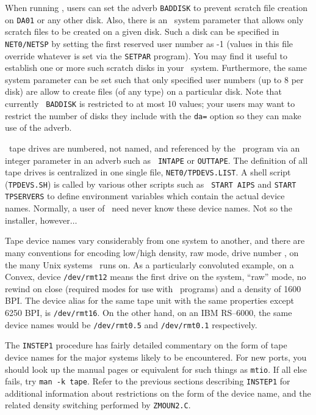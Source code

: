 When running \AIPS, users can set the adverb {\tt BADDISK} to prevent
scratch file creation on {\tt\dol DA01} or any other disk.  Also, there is
an \AIPS\ system parameter that allows only scratch files to be created
on a given disk.  Such a disk can be specified in {\tt \dol NET0/NETSP} by
setting the first reserved user number as -1 (values in this file
override whatever is set via the {\tt SETPAR} program).  You may find it
useful to establish one or more such scratch disks in your
\AIPS\ system.  Furthermore, the same system parameter can be set such
that only specified user numbers (up to 8 per disk) are allow to create
files (of any type) on a particular disk.  Note that currently {\tt
BADDISK} is restricted to at most 10 values; your users may want to
restrict the number of disks they include with the {\tt da=} option so
they can make use of the adverb.
\medskip


\AIPS\ tape drives are numbered, not named, and referenced by the
\ttaips\ program via an integer parameter in an adverb such as {\tt
INTAPE} or {\tt OUTTAPE}.  The definition of all tape drives is
centralized in one single file, {\tt\dol NET0/TPDEVS.LIST}.  A shell
script ({\tt TPDEVS.SH}) is called by various other scripts such as {\tt
START AIPS} and {\tt START TPSERVERS} to define environment
variables which contain the actual device names.  Normally, a user of
\AIPS\ need never know these device names.  Not so the installer,
however$\dots$

Tape device names vary considerably from one system to another, and
there are many conventions for encoding low/high density, raw mode,
drive number \etc, on the many Unix systems \AIPS\ runs on.  As a
particularly convoluted example, on a Convex, device {\tt /dev/rmt12}
means the first drive on the system, ``raw'' mode, no rewind on close
(required modes for use with \AIPS\ programs) and a density of 1600 BPI.
The device alias for the same tape unit with the same properties except
6250 BPI, is {\tt /dev/rmt16}.  On the other hand, on an IBM RS--6000,
the same device names would be {\tt /dev/rmt0.5} and {\tt /dev/rmt0.1}
respectively.

The {\tt INSTEP1} procedure has fairly detailed commentary on the form
of tape device names for the major systems likely to be encountered.
For new ports, you should look up the manual pages or equivalent for
such things as {\tt mtio}.  If all else fails, try {\tt man -k tape}.
Refer to the previous sections describing {\tt INSTEP1} for additional
information about restrictions on the form of the device name, and the
related density switching performed by {\tt ZMOUN2.C}.

